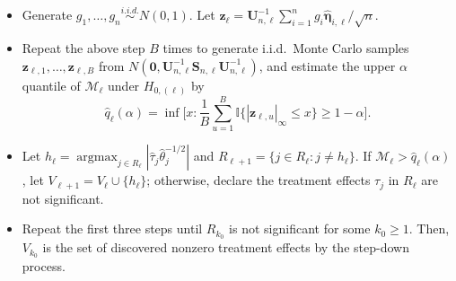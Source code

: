 \documentclass[12pt]{article}
\theoremstyle{definition}
\newcommand{\bR}{{\mathbf R}}
\newcommand{\bS}{{\mathbf S}}
\newcommand{\bU}{{\mathbf U}}
\newcommand{\bz}{{\mathbf z}}
\newcommand{\bfeta}  {\boldsymbol{\eta}}
\newcommand{\brho}{\mbox{\boldmath$\rho$}}
\newcommand{\btheta} {\boldsymbol{\theta}}
\newcommand{\bzero}{{\mathbf 0}}
\begin{document}
\begin{itemize}

\item Generate $g_{1}, \ldots, g_{n} \overset{i.i.d.}{\sim} N(0, 1)$.
Let $\bz_{\ell} = \bU_{n, \ell}^{-1} \sum_{i=1}^{n} g_{i}\hat{\bfeta}_{i,\ell} / \sqrt{n}$.

\item Repeat the above step $B$ times to generate i.i.d.\ Monte Carlo samples ${\bz}_{\ell, 1}, \ldots, {\bz}_{\ell, B}$ from $N(\bzero, \bU_{n, \ell}^{-1} \bS_{n, \ell} \bU_{n, \ell}^{-1})$, and
estimate the upper $\alpha$ quantile of $\mathcal{M}_{\ell}$ under $H_{0, (\ell)}$ by
\begin{equation}\label{eq:hatqPopulation}
\hat{q}_{\ell}(\alpha) = \inf\bigg[x: \frac{1}{B}\sum_{u=1}^{B} \mathbb{I}\big\{|{\bz}_{\ell, u}|_\infty\leq x\big\} \geq  1-\alpha\bigg].
\end{equation}

\item
Let $h_{\ell} = \operatorname{argmax}_{j \in R_{\ell}} |\hat{\tau}_{j} \hat{\theta}_{j}^{-1/2}|$ 
and $R_{\ell + 1} = \{j \in R_{\ell}: j \neq h_{\ell}\}$.
If $\mathcal{M}_{\ell} > \hat{q}_{\ell}(\alpha)$, let $V_{\ell + 1} = V_{\ell} \cup \{h_{\ell}\}$;
otherwise, declare the treatment effects $\tau_{j}$ in $R_{\ell}$ are not significant.

\item Repeat the first three steps until $R_{k_0}$ is not significant for some $k_0 \geq 1$. Then, $V_{k_0}$ is the set of discovered nonzero treatment effects by the step-down process. 


\end{itemize}
\end{document}
